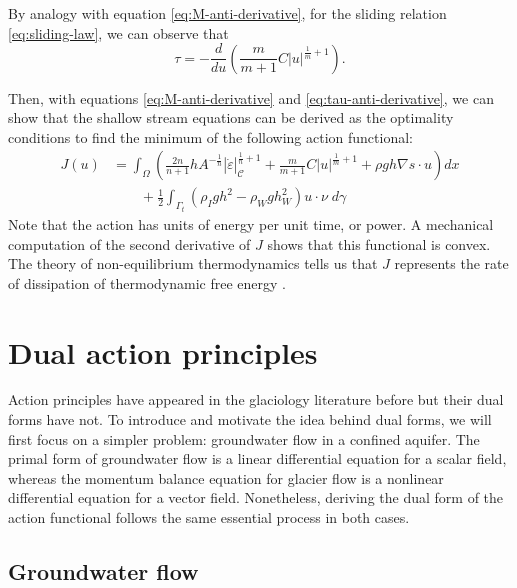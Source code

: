 \documentclass{article}
\theoremstyle{definition}
\theoremstyle{plain}
\begin{document}
By analogy with equation \eqref{eq:M-anti-derivative}, for the sliding relation \eqref{eq:sliding-law}, we can observe that
\begin{equation}
    \tau = -\frac{d}{du}\left(\frac{m}{m + 1}C|u|^{\frac{1}{m} + 1}\right).
    \label{eq:tau-anti-derivative}
\end{equation}

Then, with equations \eqref{eq:M-anti-derivative} and \eqref{eq:tau-anti-derivative}, we can show that the shallow stream equations can be derived as the optimality conditions to find the minimum of the following action functional:
\begin{align}
    J(u) & = \int_\Omega\left(\frac{2n}{n + 1}hA^{-\frac{1}{n}}|\dot\varepsilon|_{\mathscr{C}}^{\frac{1}{n} + 1} + \frac{m}{m + 1}C|u|^{\frac{1}{m} + 1} + \rho gh\nabla s\cdot u\right)dx  \nonumber \\
    & \qquad + \frac{1}{2}\int_{\Gamma_t}\left(\rho_Igh^2 - \rho_Wgh_W^2\right)u\cdot\nu\; d\gamma
    \label{eq:ssa-primal-action}
\end{align}
Note that the action has units of energy per unit time, or power.
A mechanical computation of the second derivative of $J$ shows that this functional is convex.
The theory of non-equilibrium thermodynamics tells us that $J$ represents the rate of dissipation of thermodynamic free energy \citep{edelen1972nonlinear}.



\section{Dual action principles}

Action principles have appeared in the glaciology literature before but their dual forms have not.
To introduce and motivate the idea behind dual forms, we will first focus on a simpler problem: groundwater flow in a confined aquifer.
The primal form of groundwater flow is a linear differential equation for a scalar field, whereas the momentum balance equation for glacier flow is a nonlinear differential equation for a vector field.
Nonetheless, deriving the dual form of the action functional follows the same essential process in both cases.

\subsection{Groundwater flow}
\end{document}
